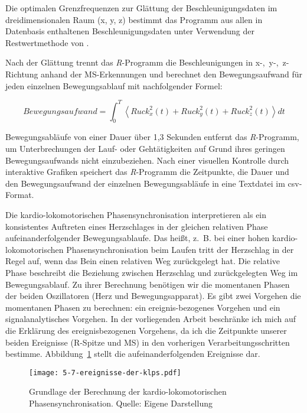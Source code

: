 Die optimalen Grenzfrequenzen zur Glättung der Beschleunigungsdaten im dreidimensionalen Raum (x, y, z) bestimmt das Programm aus allen in Datenbasis enthaltenen Beschleunigungsdaten unter Verwendung der Restwertmethode von \citet{Wells1980}.

Nach der Glättung trennt das \emph{R}-Programm die Beschleunigungen in \mbox{x-, y-, z-Richtung} anhand der \ac{MS}-Erkennungen und berechnet den Bewegungsaufwand für jeden einzelnen Bewegungsablauf mit nachfolgender Formel:

\begin{equation}
	Bewegungsaufwand = \int^T_0 \left\langle {Ruck^2_{x}(t) + Ruck^2_{y}(t) + Ruck^2_{z}(t)}\right\rangle dt
\end{equation}

Bewegungsabläufe von einer Dauer über 1,3 Sekunden entfernt das \emph{R}-Programm, um Unterbrechungen der Lauf- oder Gehtätigkeiten auf Grund ihres geringen Bewegungsaufwands nicht einzubeziehen. Nach einer visuellen Kontrolle durch interaktive Grafiken speichert das \emph{R}-Programm die Zeitpunkte, die Dauer und den Bewegungsaufwand der einzelnen Bewegungsabläufe in eine Textdatei im \acs{csv}-Format.

Die kardio-lokomotorischen Phasensynchronisation interpretieren \citet[][S.~12]{Niizeki2014} als ein konsistentes Auftreten eines Herzschlages in der gleichen relativen Phase aufeinanderfolgender Bewegungsablaufe. Das heißt, z.~B. bei einer hohen kardio-lokomotorischen Phasensynchronisation beim Laufen tritt der Herzschlag in der Regel auf, wenn das Bein einen relativen Weg zurückgelegt hat. Die relative Phase beschreibt die Beziehung zwischen Herzschlag und zurückgelegten Weg im Bewegungsablauf. Zu ihrer Berechnung benötigen wir die momentanen Phasen der beiden Oszillatoren (Herz und Bewegungsapparat). Es gibt zwei Vorgehen die momentanen Phasen zu berechnen: ein ereignis-bezogenes Vorgehen und ein signalanalytisches Vorgehen. In der vorliegenden Arbeit beschränke ich mich auf die Erklärung des ereignisbezogenen Vorgehens, da ich die Zeitpunkte unserer beiden Ereignisse (R-Spitze und \ac{MS}) in den vorherigen Verarbeitungsschritten bestimme. Abbildung~\ref{fig:5_7_ereignisse_der_klps} stellt die aufeinanderfolgenden Ereignisse dar.

\begin{figure}[t]
	\centering
		\texttt{[image: 5-7-ereignisse-der-klps.pdf]}
	\caption[Grundlage der Berechnung der kardio-lokomotorischen Phasensynchronisation]{Grundlage der Berechnung der kardio-lokomotorischen Phasensynchronisation. Quelle: Eigene Darstellung}
	\label{fig:5_7_ereignisse_der_klps}
\end{figure}

